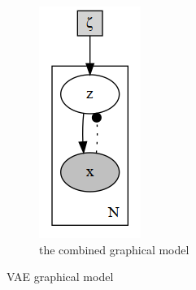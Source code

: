 \documentclass[final]{beamer}
\theoremstyle{plain}
\theoremstyle{definition}
\theoremstyle{remark}
\begin{document}
\begin{frame}
\begin{figure}[h]
\begin{subfigure}[b]{0.2\textwidth}
\includegraphics[width=\textwidth]{plots/vae.gv.png}
\caption{the combined graphical model}
\end{subfigure}
\caption{VAE graphical model}
\label{fig:vae_model}
\end{figure}

\end{frame}
\end{document}
